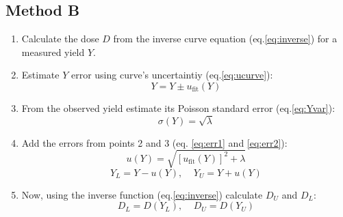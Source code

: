 \documentclass[a4paper,11pt]{article}
\begin{document}
\subsection{Method B}
\begin{enumerate}
\item Calculate the dose $D$ from the inverse curve equation (eq.\ref{eq:inverse}) for a measured yield $Y$.
\item Estimate $Y$ error using curve's uncertaintiy (eq.\ref{eq:ucurve}):
\begin{equation} \label{eq:err1}
Y = Y \pm u_{\textrm{fit}}(Y)
\end{equation}
\item From the observed yield estimate its Poisson standard error (eq.\ref{eq:Yvar}):
\begin{equation} \label{eq:err2}
\sigma(Y) = \sqrt{\lambda}
\end{equation}
\item Add the errors from points 2 and 3 (eq. \ref{eq:err1} and \ref{eq:err2}):
\begin{equation} \label{eq:err}
u(Y) = \sqrt{ \left[ u_{\textrm{fit}}(Y) \right]^2 + \lambda }
\end{equation}
\begin{equation} \label{eq:YLU}
Y_L = Y - u(Y),~~~~~Y_U = Y + u(Y)
\end{equation}
\item Now, using the inverse function (eq.\ref{eq:inverse}) calculate $D_U$ and $D_L$:
\begin{equation} \label{eq:DLU}
D_L = D(Y_L),~~~~~D_U = D(Y_U)
\end{equation}
\end{enumerate}
\end{document}
